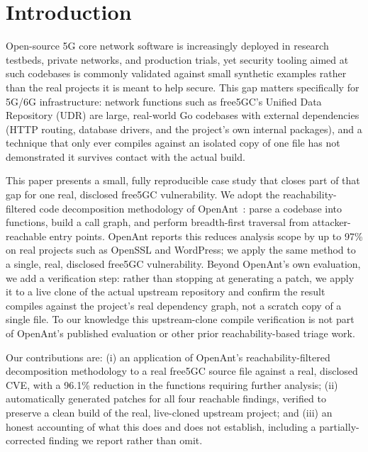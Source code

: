 \documentclass[sigconf]{acmart}
\begin{document}
\maketitle
\sloppy

\section{Introduction}

Open-source 5G core network software is increasingly deployed in
research testbeds, private networks, and production trials, yet
security tooling aimed at such codebases is commonly validated against
small synthetic examples rather than the real projects it is meant to
help secure. This gap matters specifically for 5G/6G infrastructure:
network functions such as free5GC's Unified Data Repository (UDR) are
large, real-world Go codebases with external dependencies (HTTP
routing, database drivers, and the project's own internal packages),
and a technique that only ever compiles against an isolated copy of one
file has not demonstrated it survives contact with the actual build.

This paper presents a small, fully reproducible case study that closes
part of that gap for one real, disclosed free5GC vulnerability. We
adopt the reachability-filtered code decomposition methodology of
OpenAnt~\cite{openant}: parse a codebase into functions, build a call
graph, and perform breadth-first traversal from attacker-reachable
entry points. OpenAnt reports this reduces analysis scope by up to
97\% on real projects such as OpenSSL and WordPress; we apply the same
method to a single, real, disclosed free5GC vulnerability. Beyond OpenAnt's own
evaluation, we add a verification step: rather than stopping at
generating a patch, we apply it to a live clone of the actual upstream
repository and confirm the result compiles against the project's real
dependency graph, not a scratch copy of a single file. To our knowledge
this upstream-clone compile verification is not part of OpenAnt's
published evaluation or other prior reachability-based triage work.

Our contributions are: (i) an application of OpenAnt's
reachability-filtered decomposition methodology to a real free5GC
source file against a real, disclosed CVE, with a 96.1\% reduction in
the functions requiring further analysis; (ii)
automatically generated patches for all four reachable findings,
verified to preserve a clean build of the real, live-cloned upstream
project; and (iii) an honest accounting of what this does and does not
establish, including a partially-corrected finding we report rather
than omit.
\end{document}
